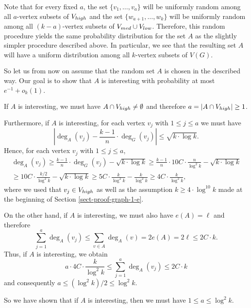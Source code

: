 \documentclass[11pt]{article}
\theoremstyle{definition}
\numberwithin{equation}{section}
\begin{document}
Note that for every fixed $a$, the set $\lbrace v_1,\dots,v_a\rbrace$ will be uniformly random among all $a$-vertex subsets of $V_{\textnormal{high}}$ and the set $\lbrace w_{a+1},\dots,w_k\rbrace$ will be uniformly random among all $(k-a)$-vertex subsets of $V_{\textnormal{med}}\cup V_{\textnormal{low}}$. Therefore, this random procedure yields the same probability distribution for the set $A$ as the slightly simpler procedure described above. In particular, we see that the resulting set $A$ will have a uniform distribution among all $k$-vertex subsets of $V(G)$.

So let us from now on assume that the random set $A$ is chosen in the described way. Our goal is to show that $A$ is interesting with probability at most $e^{-1}+o_k(1)$.

If $A$ is interesting, we must have $A\cap V_{\textnormal{high}}\neq\emptyset$ and therefore $a=\vert A\cap V_{\textnormal{high}}\vert\geq 1$.

Furthermore, if $A$ is interesting, for each vertex $v_j$ with $1\leq j\leq a$ we must have
\begin{equation}\label{ineq-v-j-A-int}
\left\vert\deg_A(v_j)-\frac{k-1}{n}\cdot \deg_G(v_j)\right\vert\leq  \sqrt{k\cdot \log k}.
\end{equation}
Hence, for each vertex $v_j$ with $1\leq j\leq a$,
\begin{multline*}
\deg_A(v_j)\geq \frac{k-1}{n}\cdot \deg_G(v_j)- \sqrt{k\cdot \log k}\geq 
\frac{k-1}{n}\cdot 10C\cdot \frac{n}{\log^2 k}- \sqrt{k\cdot \log k}\\
\geq 10C\cdot \frac{k/2}{\log^2 k}- \sqrt{k\cdot \log k}\geq 5C\cdot \frac{k}{\log^2 k}- \frac{k}{\log^2 k}\geq 4C\cdot \frac{k}{\log^2 k},
\end{multline*}
where we used that $v_j\in V_{\textnormal{high}}$ as well as the assumption $k\geq 4\cdot \log^{10} k$ made at the beginning of Section \ref{sect-proof-graph-1-e}.

On the other hand, if $A$ is interesting, we must also have $e(A)=\ell$ and therefore
\[\sum_{j=1}^{a}\deg_A(v_j)\leq \sum_{v\in A}\deg_A(v)=2e(A)=2\ell\leq 2C\cdot k.\]
Thus, if $A$ is interesting, we obtain
\[a\cdot 4C\cdot \frac{k}{\log^2 k}\leq \sum_{j=1}^{a}\deg_A(v_j)\leq 2C\cdot k\]
and consequently $a\leq (\log^2 k)/2\leq \log^2 k$.

So we have shown that if $A$ is interesting, then we must have $1\leq a\leq \log^2 k$.
\end{document}
